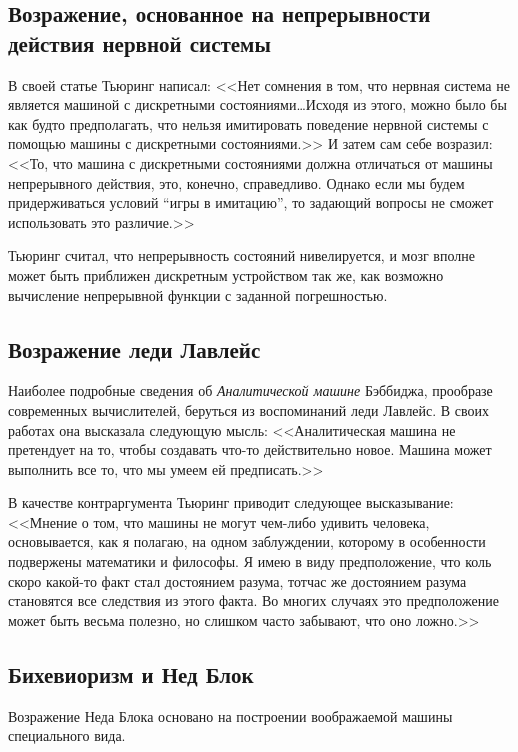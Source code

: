 \documentclass[a4paper,14pt]{scrartcl}
\begin{document}
\subsection{Возражение, основанное на непрерывности действия нервной системы}

В своей статье Тьюринг написал: <<Нет сомнения в том, что нервная система не является машиной с дискретными состояниями\ldots Исходя из этого, можно было бы как будто предполагать, что нельзя имитировать поведение нервной системы с помощью машины с дискретными состояниями.>> И затем сам себе возразил: <<То, что машина с дискретными состояниями должна отличаться от машины непрерывного действия, это, конечно, справедливо. Однако если мы будем придерживаться условий ``игры в имитацию'', то задающий вопросы не сможет использовать это различие.>>

Тьюринг считал, что непрерывность состояний нивелируется, и мозг вполне может быть приближен дискретным устройством так же, как возможно вычисление непрерывной функции с заданной погрешностью.


\subsection{Возражение леди Лавлейс}

Наиболее подробные сведения об {\it Аналитической машине} Бэббиджа, прообразе современных вычислителей, беруться из воспоминаний леди Лавлейс. В своих работах она высказала следующую мысль: <<Аналитическая машина не претендует на то, чтобы создавать что-то действительно новое. Машина может выполнить все то, что мы умеем ей предписать.>>

В качестве контраргумента Тьюринг приводит следующее высказывание: <<Мнение о том, что машины не могут чем-либо удивить человека, основывается, как я полагаю, на одном заблуждении, которому в особенности подвержены математики и философы. Я имею в виду предположение, что коль скоро какой-то факт стал достоянием разума, тотчас же достоянием разума становятся все следствия из этого факта. Во многих случаях это предположение может быть весьма полезно, но слишком часто забывают, что оно ложно.>>

\subsection{Бихевиоризм и Нед Блок}

Возражение Неда Блока \cite{block_1981} основано на построении воображаемой машины специального вида. 
\end{document}
